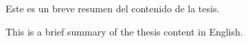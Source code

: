\label{cap:resumen}
Este es un breve resumen del contenido de la tesis.

\label{cap:abstract}
This is a brief summary of the thesis content in English.